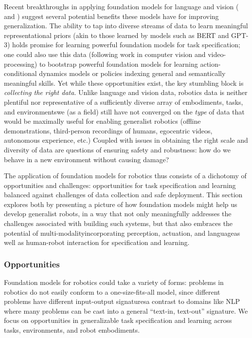 Recent breakthroughs in applying foundation models for language and vision ( and ) suggest several potential benefits these models have for improving generalization. The ability to tap into diverse streams of data to learn meaningful representational priors (akin to those learned by models such as BERT and GPT-3) holds promise for learning powerful foundation models for task specification; one could also use this data (following work in computer vision and video-processing) to bootstrap powerful foundation models for learning action-conditional dynamics models or policies indexing general and semantically meaningful skills. Yet while these opportunities exist, the key stumbling block is \textit{collecting the right data}. Unlike language and vision data, robotics data is neither plentiful nor representative of a sufficiently diverse array of embodiments, tasks, and environments\dash{}we (as a field) still have not converged on the \textit{type} of data that would be maximally useful for enabling generalist robotics (\eg offline demonstrations, third-person recordings of humans, egocentric videos, autonomous experience, etc.) Coupled with issues in obtaining the right scale and diversity of data are questions of ensuring safety and robustness: how do we behave in a new environment without causing damage?

The application of foundation models for robotics thus consists of a dichotomy of opportunities and challenges: opportunities for task specification and learning balanced against challenges of data collection and safe deployment. This section explores both by presenting a picture of how foundation models might help us develop generalist robots, in a way that not only meaningfully addresses the challenges associated with building such systems, but that also embraces the potential of multi-modality\dash{}incorporating perception, actuation, and language\dash{}as well as human-robot interaction for specification and learning.

\subsubsection{Opportunities}
\label{sec:robotics-opportunities}

Foundation models for robotics could take a variety of forms: problems in robotics do not easily conform to a one-size-fits-all model, since different problems have different input-output signatures\dash{}a contrast to domains like NLP where many problems can be cast into a general ``text-in, text-out'' signature. We focus on opportunities in generalizable task specification and learning across tasks, environments, and robot embodiments.

